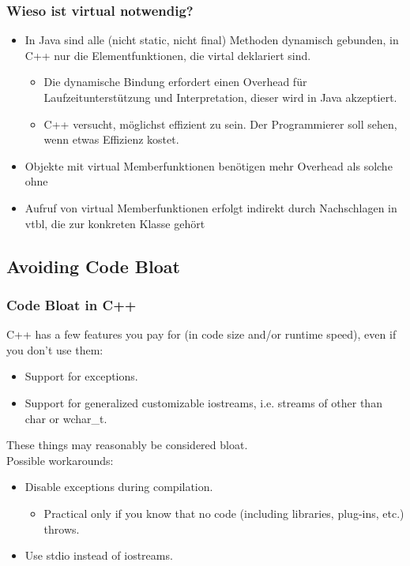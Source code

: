 \subsubsection{Wieso ist virtual notwendig?}
\begin{itemize}
  \item In Java sind alle (nicht static, nicht final) Methoden dynamisch gebunden, in C++ nur die Elementfunktionen, die virtal deklariert sind.
  \begin{itemize}
    \item Die dynamische Bindung erfordert einen Overhead für Laufzeitunterstützung und Interpretation, dieser wird in Java akzeptiert.
    \item C++ versucht, möglichst effizient zu sein. Der Programmierer soll sehen, wenn etwas Effizienz kostet.
  \end{itemize}
  \item Objekte mit virtual Memberfunktionen benötigen mehr Overhead als solche ohne
  \item Aufruf von virtual Memberfunktionen erfolgt indirekt durch Nachschlagen in vtbl, die zur konkreten Klasse gehört
\end{itemize}

\subsection{Avoiding Code Bloat}
\subsubsection{Code Bloat in C++}
C++ has a few features you pay for (in code size and/or runtime speed), even if you don't use them:
\begin{itemize}
  \item Support for exceptions.
  \item Support for generalized customizable iostreams, i.e. streams of other than char or wchar\_t.
\end{itemize}
These things may reasonably be considered bloat.\\
Possible workarounds:
\begin{itemize}
  \item Disable exceptions during compilation.
  \begin{itemize}
    \item Practical only if you know that no code (including libraries, plug-ins, etc.) throws.
  \end{itemize}
  \item Use stdio instead of iostreams.
\end{itemize}

